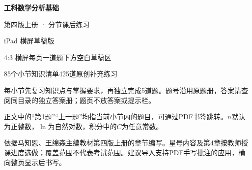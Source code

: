 \documentclass[12pt,fontset=fandol]{ctexrep}
\begin{document}
\fontsize{14}{21}\selectfont
\thispagestyle{empty}
\begin{center}
\vspace*{9mm}
{\fontsize{27}{36}\selectfont\bfseries 工科数学分析基础\par}
\vspace{4mm}
{\fontsize{22}{30}\selectfont 第四版上册 · 分节课后练习\par}
\vspace{5mm}
{\Large iPad 横屏草稿版\par}
\vspace{5mm}
4:3 横屏\quad 每页一道题\quad 下方空白草稿区\par
85个小节知识清单\quad 425道原创补充练习\par
\end{center}
\vspace{5mm}
{\fontsize{11}{17}\selectfont
每小节先复习知识点与掌握要求，再独立完成5道题。题号沿用原题册，答案请查阅同目录的独立答案册；题页不放答案或提示栏。

正文中的“第1题”“上一题”均指当前小节内的题目，可通过PDF书签跳转。$n$默认为正整数，$\ln$为自然对数，积分中的$C$为任意常数。

依据马知恩、王绵森主编教材第四版上册的章节编写。星号内容及第4章按教师授课进度选做；覆盖范围不代表考试范围。建议导入支持PDF手写批注的应用，横向整页显示后书写。\par}
\expandafter\printpractice\originalpractice\stoppractice
\end{document}
